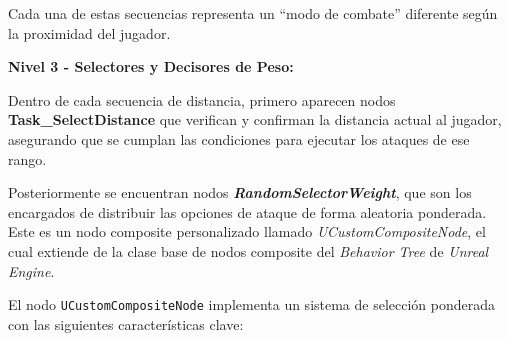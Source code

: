 \documentclass[informe]{upropuesta}
\begin{document}
Cada una de estas secuencias representa un ``modo de combate'' diferente según la proximidad del jugador.

\textbf{Nivel 3 - Selectores y Decisores de Peso:}

Dentro de cada secuencia de distancia, primero aparecen nodos \textbf{Task\_SelectDistance} que verifican y confirman la distancia actual al jugador, asegurando que se cumplan las condiciones para ejecutar los ataques de ese rango.

Posteriormente se encuentran nodos \textbf{\textit{RandomSelectorWeight}}, que son los encargados de distribuir las opciones de ataque de forma aleatoria ponderada. Este es un nodo composite personalizado llamado \textit{UCustomCompositeNode}, el cual extiende de la clase base de nodos composite del \textit{Behavior Tree} de \textit{Unreal Engine}.

El nodo \texttt{UCustomCompositeNode} implementa un sistema de selección ponderada con las siguientes características clave:
\end{document}
